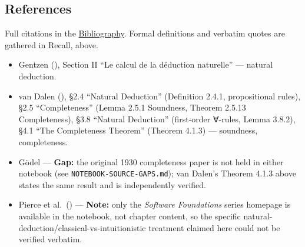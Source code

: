 \subsection{References}\label{sec:03-propositions-and-proofs:02-logic-recap:9}

Full citations in the \hyperref[sec:root:bibliography:1]{Bibliography}. Formal definitions and verbatim quotes are gathered in Recall, above.

\begin{itemize}
\tightlist
\item
  Gentzen (\cite{Gentzen1935}), Section II ``Le calcul de la déduction naturelle'' --- natural deduction.
\item
  van Dalen (\cite{VanDalen2013}), §2.4 ``Natural Deduction'' (Definition 2.4.1, propositional rules), §2.5 ``Completeness'' (Lemma 2.5.1 Soundness, Theorem 2.5.13 Completeness), §3.8 ``Natural Deduction'' (first-order ∀-rules, Lemma 3.8.2), §4.1 ``The Completeness Theorem'' (Theorem 4.1.3) --- soundness, completeness.
\item
  Gödel --- \textbf{Gap:} the original 1930 completeness paper is not held in either notebook (see \texttt{NOTEBOOK-\allowbreak{}SOURCE-\allowbreak{}GAPS.md}); van Dalen's Theorem 4.1.3 above states the same result and is independently verified.
\item
  Pierce et al.~(\cite{PierceSF}) --- \textbf{Note:} only the \emph{Software Foundations} series homepage is available in the notebook, not chapter content, so the specific natural-deduction/classical-vs-intuitionistic treatment claimed here could not be verified verbatim.
\end{itemize}
